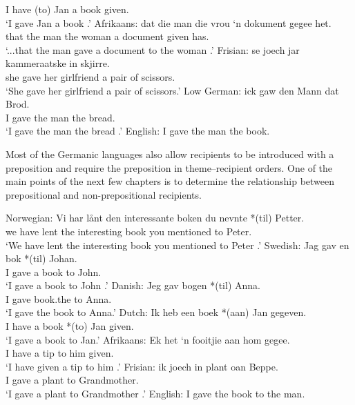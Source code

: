 \documentclass[11pt]{upenndiss}
\begin{document}
\begin{exe}
\begin{xlist}
I have (to) Jan a book given.\\
\trans `I gave Jan a book \citep{Tiersma.1985}.'
\ex Afrikaans:
\gll dat die man die vrou `n dokument gegee het.\\
that the man the woman a document given has.\\
\trans `...that the man gave a document to the woman \citep{Louw.2012}.'
\ex Frisian:
\gll se joech jar kammeraatske in skjirre.\\
she gave her girlfriend a {pair of scissors}.\\
\trans `She gave her girlfriend a pair of scissors.'
\ex Low German: 
\gll ick gaw den Mann dat Brod.\\
I gave the man the bread.\\
\trans `I gave the man the bread \citep{Mussaus.1829}.'
\ex English: I gave the man the book.
\end{xlist}
\end{exe}

Most of the Germanic languages also allow recipients to be introduced with a preposition and require the preposition in theme--recipient orders. One of the main points of the next few chapters is to determine the relationship between prepositional and non-prepositional recipients.

\begin{exe}
	\ex \label{ex:preprec}
	\begin{xlist}
		\ex Norwegian:
		\gll Vi har lånt den interessante boken du nevnte *(til) Petter.\\
		we have lent the interesting book you mentioned to Peter.\\
		\trans `We have lent the interesting book you mentioned to Peter \citep{Larson.1988}.'
		\ex Swedish:
		\ex \gll Jag gav en bok *(til) Johan.\\
		I gave a book to John.\\
		\trans `I gave a book to John \citep{Holmberg.1995}.'
		\ex Danish:	
		\gll Jeg gav bogen *(til) Anna.\\
		I gave book.the to Anna.\\
		\trans `I gave the book to Anna\citep{Holmberg.1998}.'
		\ex Dutch:
		\gll Ik heb een boek *(aan) Jan gegeven.\\
		I have a book *(to) Jan given.\\
		\trans `I gave a book to Jan.'
		\ex Afrikaans: 
		\gll Ek het `n fooitjie aan hom gegee.\\
		I have a tip to him given.\\
		\trans `I have given a tip to him \citep{Stadler.1996}.'
		\ex Frisian:
		\gll ik joech in plant oan Beppe.\\
		I gave a plant to Grandmother.\\
		\trans `I gave a plant to Grandmother \citep{Tiersma.1985}.'
		\ex English: I gave the book to the man.
	\end{xlist}
\end{exe}
\end{document}
